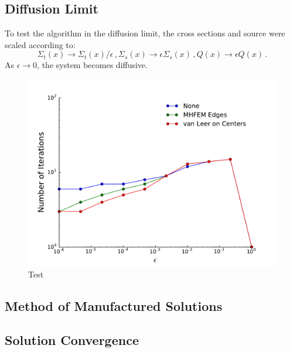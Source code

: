 
\subsection{Diffusion Limit}
	To test the algorithm in the diffusion limit, the cross sections and source were scaled according to: 
		\begin{equation} \label{res:scaling}
			\Sigma_t(x) \rightarrow \Sigma_t(x)/\epsilon\,, 
			\Sigma_s(x) \rightarrow \epsilon \Sigma_s(x) \,,
			Q(x) \rightarrow \epsilon Q(x)\,. 
		\end{equation}
	As $\epsilon \rightarrow 0$, the system becomes diffusive. 

	\begin{figure} \centering
		\includegraphics[width=5in]{figs/diffLimit.pdf}
		\caption{Test}
	\end{figure}

\subsection{Method of Manufactured Solutions}

\subsection{Solution Convergence}